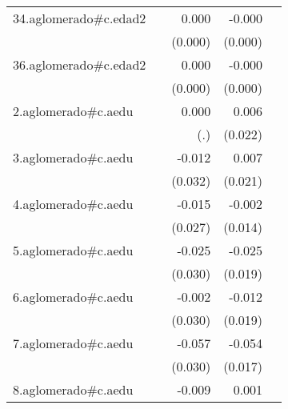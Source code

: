 {\begin{longtable}{l*{4}{D{.}{.}{-1}}}
\addlinespace
34.aglomerado#c.edad2&                     &       0.000\sym{**} &      -0.000         &                     \\
            &                     &     (0.000)         &     (0.000)         &                     \\
\addlinespace
36.aglomerado#c.edad2&                     &       0.000         &      -0.000\sym{**} &                     \\
            &                     &     (0.000)         &     (0.000)         &                     \\
\addlinespace
2.aglomerado#c.aedu&                     &       0.000         &       0.006         &                     \\
            &                     &         (.)         &     (0.022)         &                     \\
\addlinespace
3.aglomerado#c.aedu&                     &      -0.012         &       0.007         &                     \\
            &                     &     (0.032)         &     (0.021)         &                     \\
\addlinespace
4.aglomerado#c.aedu&                     &      -0.015         &      -0.002         &                     \\
            &                     &     (0.027)         &     (0.014)         &                     \\
\addlinespace
5.aglomerado#c.aedu&                     &      -0.025         &      -0.025         &                     \\
            &                     &     (0.030)         &     (0.019)         &                     \\
\addlinespace
6.aglomerado#c.aedu&                     &      -0.002         &      -0.012         &                     \\
            &                     &     (0.030)         &     (0.019)         &                     \\
\addlinespace
7.aglomerado#c.aedu&                     &      -0.057         &      -0.054\sym{**} &                     \\
            &                     &     (0.030)         &     (0.017)         &                     \\
\addlinespace
8.aglomerado#c.aedu&                     &      -0.009         &       0.001         &                     \\

\end{longtable}}
